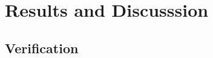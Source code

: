 \documentclass[12pt]{uthesis-v12}  %
\begin{document}
\chapter{Results and Discusssion}
\section{Verification}








\end{document}
